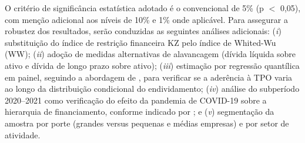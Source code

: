 \documentclass[a4paper,12pt]{article}
\begin{document}
O critério de significância estatística adotado é o convencional de 5\% (p $<$ 0,05), com menção adicional aos níveis de 10\% e 1\% onde aplicável. Para assegurar a robustez dos resultados, serão conduzidas as seguintes análises adicionais: (\textit{i}) substituição do índice de restrição financeira KZ pelo índice de Whited-Wu (WW); (\textit{ii}) adoção de medidas alternativas de alavancagem (dívida líquida sobre ativo e dívida de longo prazo sobre ativo); (\textit{iii}) estimação por regressão quantílica em painel, seguindo a abordagem de \cite{Yildirim2021}, para verificar se a aderência à TPO varia ao longo da distribuição condicional do endividamento; (\textit{iv}) análise do subperíodo 2020–2021 como verificação do efeito da pandemia de COVID-19 sobre a hierarquia de financiamento, conforme indicado por \cite{Souza2024}; e (\textit{v}) segmentação da amostra por porte (grandes versus pequenas e médias empresas) e por setor de atividade.
 
\newpage


\end{document}
